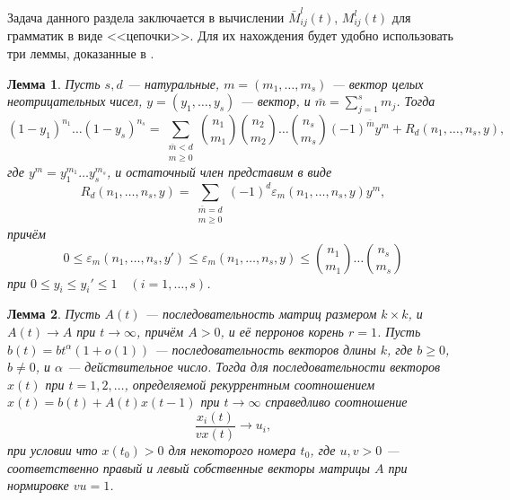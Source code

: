 \documentclass[11pt]{article}
\newtheorem{lemma}{Лемма}
\begin{document}
Задача данного раздела заключается в вычислении $\bar{M}^l_{ij}(t)$, $M^l_{ij}(t)$ для грамматик в виде <<цепочки>>. Для их нахождения будет удобно использовать три леммы, доказанные в \cite{borisov-disser}.

\begin{lemma}
\label{l:powers}
    Пусть $s,d$ --- натуральные, $m = (m_1, \ldots, m_s)$ --- вектор целых неотрицательных чисел, $y = (y_1, \ldots, y_s)$ --- вектор, и $\bar{m} = \sum_{j = 1}^s m_j$. Тогда
    \begin{equation}
        (1 - y_1)^{n_1} \ldots (1 - y_s)^{n_s} = \sum_{\substack{\bar{m} < d \\ m \geqslant 0}} \binom{n_1}{m_1} \binom{n_2}{m_2} \ldots \binom{n_s}{m_s} (-1)^{\bar{m}} y^m + R_d(n_1, \ldots, n_s, y),
    \end{equation}
    где $y^m = y_1^{m_1} \ldots y_s^{m_s}$, и остаточный член представим в виде
    \begin{equation}
        R_d(n_1, \ldots, n_s, y) = \sum_{\substack{\bar{m} = d \\ m \geqslant 0}} (-1)^d \varepsilon_m(n_1, \ldots, n_s, y) y^m,
    \end{equation}
    причём
    \begin{equation}
        0 \leqslant \varepsilon_m(n_1, \ldots, n_s, y') \leqslant \varepsilon_m(n_1, \ldots, n_s, y) \leqslant \binom{n_1}{m_1} \ldots \binom{n_s}{m_s}
    \end{equation}
    при $0 \leqslant y_i \leqslant y_i' \leqslant 1\quad{}(i = 1,\ldots,s)$.
\end{lemma}

\begin{lemma}
\label{l:x_b_a}
    Пусть $A(t)$ --- последовательность матриц размером $k \times k$, и $A(t) \rightarrow A$ при $t \rightarrow \infty$, причём $A > 0$, и её перронов корень $r = 1$. Пусть $b(t) = b t^{\alpha} (1 + o(1))$ --- последовательность векторов длины $k$, где $b \geqslant 0$, $b \neq 0$, и $\alpha$ --- действительное число. Тогда для последовательности векторов $x(t)$ при $t = 1,2,\ldots$, определяемой рекуррентным соотношением $x(t) = b(t) + A(t) x(t-1)$ при $t \rightarrow \infty$ справедливо соотношение
    \begin{equation}
        \frac{ x_i(t) }{ v x(t) } \rightarrow u_i,
    \end{equation}
    при условии что $x(t_0) > 0$ для некоторого номера $t_0$, где $u,v > 0$ --- соответственно правый и левый собственные векторы матрицы $A$ при нормировке $vu = 1$.
\end{lemma}
\end{document}
